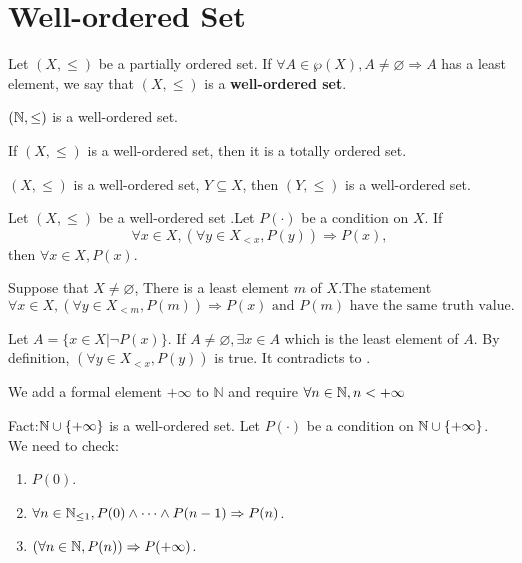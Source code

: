\section{Well-ordered Set}
\begin{definitionenv}\label{4.7.1}
    Let $(X, \le)$ be a partially ordered set. If $\forall A\in \wp(X), A\not=\varnothing\Rightarrow A$ has a least element, we say that $(X, \le)$ is a \textbf{well-ordered set}.
\end{definitionenv}
\begin{axiomenv}
    $(\mathbb{N}, \le)$ is a well-ordered set.
\end{axiomenv}
\begin{propositionenv}
    If $(X, \le)$ is a well-ordered set,  then it is a totally ordered set.
\end{propositionenv}
\begin{propositionenv}
    $(X, \le)$ is a well-ordered set, $Y\subseteq X$,  then $(Y, \le)$ is a well-ordered set. 
\end{propositionenv}
\begin{theoremenv}
    Let $(X, \le)$ be a well-ordered set .Let $P(\cdot)$ be a condition on $X$. If 
    $$\forall x\in X, (\forall y\in X_{<x} , P(y))\Rightarrow P(x), $$
    then $\forall x\in X, P(x)$.
\end{theoremenv}
\begin{remark}
    Suppose that $X\not=\varnothing$, There is a least element $m$ of $X$.The statement
    $$\forall x\in X, (\forall y\in X_{<m} , P(m))\Rightarrow P(x) \text{ and } P(m) \text{ have the same truth value.}$$
\end{remark}
\begin{proofenv}
    Let $A=\{x\in X|\neg P(x)\}$. If $A\not=\varnothing, \exists x\in A$ which is the least element of $A$. By definition,  $(\forall y\in X_{<x} , P(y))$ is true. It contradicts to .
\end{proofenv}
\begin{remark}
    We add a formal element $+\infty$ to $\mathbb{N}$ and require $\forall n\in \mathbb{N},  n<+\infty$
\end{remark}
Fact:$\mathbb{N} \cup \{+\infty\}$ is a well-ordered set. Let $P(\cdot)$ be a condition on $\mathbb{N} \cup \{+\infty\}$. We need to check:
\begin{enumerate}
    \item $P(0)$.
    \item $\forall n\in \mathbb{N}_{\leq 1}, P(0)\wedge\dots\wedge P(n-1)\Rightarrow P(n)$.
    \item $(\forall n \in \mathbb{N}, P(n))\Rightarrow P(+\infty)$.
\end{enumerate}

